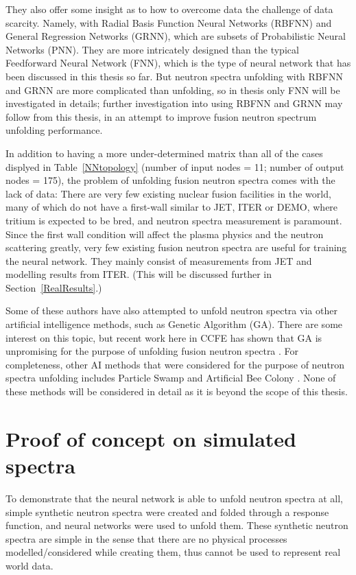 \documentclass[a4paper, 12pt]{article}
\begin{document}
They also offer some insight as to how to overcome data the challenge of data scarcity. Namely, with Radial Basis Function Neural Networks (RBFNN) and General Regression Networks (GRNN), which are subsets of Probabilistic Neural Networks (PNN). They are more intricately designed than the typical Feedforward Neural Network (FNN), which is the type of neural network that has been discussed in this thesis so far.
But neutron spectra unfolding with RBFNN\cite{RBF-NN}\cite{ThreeAIUnfolding} and GRNN\cite{NNNeutronFluenceAmbientDoseEquivalent}\cite{unfoldingCodeBasedOnGeneralizedRegressionANN}\cite{ThreeAIUnfolding} are more complicated than unfolding, so in thesis only FNN will be investigated in details; further investigation into using RBFNN and GRNN may follow from this thesis, in an attempt to improve fusion neutron spectrum unfolding performance.

In addition to having a more under-determined matrix than all of the cases displyed in Table~\ref{NNtopology} (number of input nodes = 11; number of output nodes = 175), the problem of unfolding fusion neutron spectra comes with the lack of data:
There are very few existing nuclear fusion facilities in the world, many of which do not have a first-wall similar to JET, ITER or DEMO, where tritium is expected to be bred, and neutron spectra measurement is paramount. Since the first wall condition will affect the plasma physics and the neutron scattering greatly, very few existing fusion neutron spectra are useful for training the neural network. They mainly consist of measurements from JET and modelling results from ITER. (This will be discussed further in Section~\ref{RealResults}.)

Some of these authors\cite{ThreeAIUnfolding} have also attempted to unfold neutron spectra via other artificial intelligence methods, such as Genetic Algorithm (GA). There are some interest on this topic\cite{SVitishaGeneticAlgorithm}\cite{HighResGeneticAlgorithm}, but recent work here in CCFE has shown that GA is unpromising for the purpose of unfolding fusion neutron spectra \cite{R.WorrallThesis}. For completeness, other AI methods that were considered for the purpose of neutron spectra unfolding includes Particle Swamp \cite{ParticleSwamp_NE-213} and Artificial Bee Colony \cite{BeeColony}. None of these methods will be considered in detail as it is beyond the scope of this thesis.

\section{Proof of concept on simulated spectra}
To demonstrate that the neural network is able to unfold neutron spectra at all, simple synthetic neutron spectra were created and folded through a response function, and neural networks were used to unfold them. These synthetic neutron spectra are simple in the sense that there are no physical processes modelled/considered while creating them, thus cannot be used to represent real world data.
\end{document}
